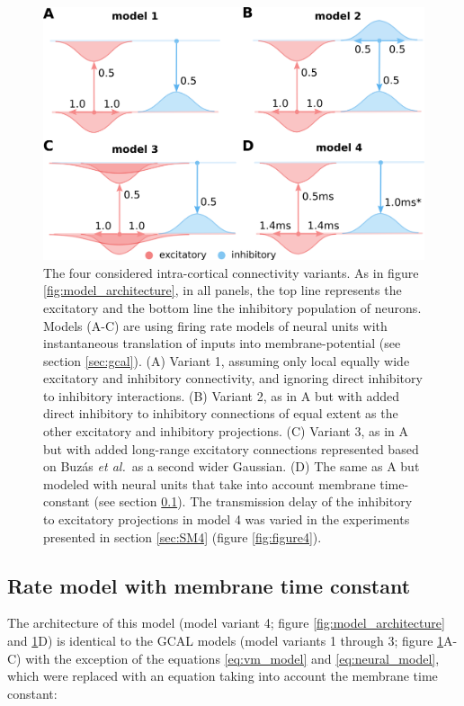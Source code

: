 \documentclass[utf8]{frontiersSCNS}
\newcommand{\etal}{\textit{et al.}}
\begin{document}
\begin{figure}[htpb!] 
\centering
\includegraphics[width=16cm]{./SVG/FigureModelVariants/drawing.png}
\caption{The four considered intra-cortical connectivity variants. As in figure \ref{fig:model_architecture}, in all panels, the top line represents the excitatory and the bottom line the inhibitory population of neurons. Models (A-C) are using firing rate models of neural units with instantaneous 
translation of inputs into membrane-potential (see section \ref{sec:gcal}). 
(A) Variant 1, assuming only local equally wide excitatory and inhibitory connectivity, and ignoring direct inhibitory to inhibitory interactions. (B) Variant 2, as in A but with added direct inhibitory to inhibitory connections of equal extent as the other excitatory and inhibitory projections. (C) Variant 3, as in A but with added long-range excitatory connections represented based on Buz\'as \etal\,\citep{Buzas2006} as a second wider Gaussian. (D) The same as A but modeled with neural units that take into account membrane time-constant (see section \ref{sec:rate}).
The transmission delay of the inhibitory to excitatory projections in model 4 was varied in the experiments presented in section \ref{sec:SM4}
(figure \ref{fig:figure4}).}
\label{fig:model_variants}
\end{figure} 


\subsection{Rate model with membrane time constant} \label{sec:rate}

The architecture of this model (model variant 4; figure \ref{fig:model_architecture} and \ref{fig:model_variants}D) is identical to the GCAL models 
(model variants 1 through 3; figure \ref{fig:model_variants}A-C) with the exception of the equations \ref{eq:vm_model} and \ref{eq:neural_model}, which were replaced with an equation taking into account the membrane time constant: 
\end{document}
